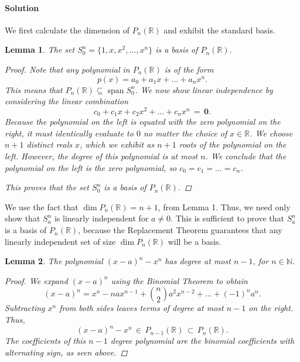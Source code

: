 \documentclass[10pt]{article}
\def\dim{\operatorname{dim}}
\def\spn{\operatorname{span}}
\newtheorem{lemma}{Lemma}
\begin{document}
        \paragraph{Solution}
        We first calculate the dimension of $P_n(\mathbb{R})$ and exhibit the standard basis.
        \begin{lemma}
                The set $S_0^n = \{1, x, x^2, \dots, x^n\}$ is a basis of $P_n(\mathbb{R})$.
                \begin{proof}
                        Note that any polynomial in $P_n(\mathbb{R})$ is of the form
                        \[
                                p(x) = a_0 + a_1x + \dots + a_nx^n.
                        \]
                        This means that $P_n(\mathbb{R}) \subseteq \spn S_0^n$. We now show linear independence by considering the linear
                        combination
                        \[
                                c_0 + c_1x + c_2x^2 + \dots + c_nx^n \,=\, \mathbf{0}.
                        \]
                        Because the polynomial on the left is equated with the zero polynomial on the right, it must identically evaluate to $0$
                        no matter the choice of $x \in \mathbb{R}$.
                        We choose $n + 1$ distinct reals $x$, which we exhibit as $n + 1$ roots of the polynomial on the left.
                        However, the degree of this polynomial is at most $n$.
                        We conclude that the polynomial on the left is the zero polynomial, so $c_0 = c_1 = \dots = c_n$.
                        
                        This proves that the set $S_0^n$ is a basis of $P_n(\mathbb{R})$.
                \end{proof}
        \end{lemma}
        We use the fact that $\dim P_n(\mathbb{R}) = n + 1$, from Lemma 1. Thus, we need only show that $S_a^n$ is linearly independent for $a \neq 0$.
        This is sufficient to prove that $S_a^n$ is a basis of $P_n(\mathbb{R})$, because the Replacement Theorem guarantees that any
        linearly independent set of size $\dim P_n(\mathbb{R})$ will be a basis.
        \begin{lemma}
                The polynomial $(x - a)^n - x^n$ has degree at most $n - 1$, for $n \in \mathbb{N}$.
                \begin{proof}
                        We expand $(x - a)^n$ using the Binomial Theorem to obtain
                        \[
                                (x - a)^n = x^n - nax^{n - 1} + \binom{n}{2}a^2x^{n - 2} + \dots + (-1)^n a^n.
                        \]
                        Subtracting $x^n$ from both sides leaves terms of degree at most $n - 1$ on the right. Thus,
                        \[
                                (x - a)^n - x^n \,\in\, P_{n - 1}(\mathbb{R}) \,\subset\, P_n(\mathbb{R}).
                        \]
                        The coefficients of this $n - 1$ degree polynomial are the binomial coefficients with alternating sign, as seen above.
                \end{proof}
        \end{lemma}
\end{document}
